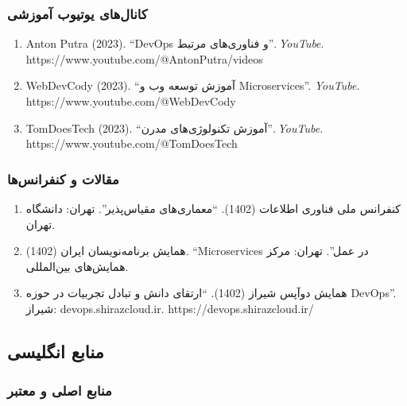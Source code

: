 \documentclass[
]{article}
\begin{document}
\subsubsection{کانال‌های یوتیوب
آموزشی}\label{ux6a9ux627ux646ux627ux644ux647ux627ux6cc-ux6ccux648ux62aux6ccux648ux628-ux622ux645ux648ux632ux634ux6cc}

\begin{enumerate}
\def\labelenumi{\arabic{enumi}.}
\setcounter{enumi}{5}
\item
  Anton Putra (2023). ``DevOps و فناوری‌های مرتبط''. \emph{YouTube}.
  https://www.youtube.com/@AntonPutra/videos
\item
  WebDevCody (2023). ``آموزش توسعه وب و Microservices''. \emph{YouTube}.
  https://www.youtube.com/@WebDevCody
\item
  TomDoesTech (2023). ``آموزش تکنولوژی‌های مدرن''. \emph{YouTube}.
  https://www.youtube.com/@TomDoesTech
\end{enumerate}

\subsubsection{مقالات و
کنفرانس‌ها}\label{ux645ux642ux627ux644ux627ux62a-ux648-ux6a9ux646ux641ux631ux627ux646ux633ux647ux627}

\begin{enumerate}
\def\labelenumi{\arabic{enumi}.}
\setcounter{enumi}{8}
\item
  کنفرانس ملی فناوری اطلاعات (1402). ``معماری‌های مقیاس‌پذیر''. تهران:
  دانشگاه تهران.
\item
  همایش برنامه‌نویسان ایران (1402). ``Microservices در عمل''. تهران: مرکز
  همایش‌های بین‌المللی.
\item
  همایش دوآپس شیراز (1402). ``ارتقای دانش و تبادل تجربیات در حوزه
  DevOps''. شیراز: devops.shirazcloud.ir. https://devops.shirazcloud.ir/
\end{enumerate}

\subsection{منابع
انگلیسی}\label{ux645ux646ux627ux628ux639-ux627ux646ux6afux644ux6ccux633ux6cc}

\subsubsection{منابع اصلی و
معتبر}\label{ux645ux646ux627ux628ux639-ux627ux635ux644ux6cc-ux648-ux645ux639ux62aux628ux631}
\end{document}
